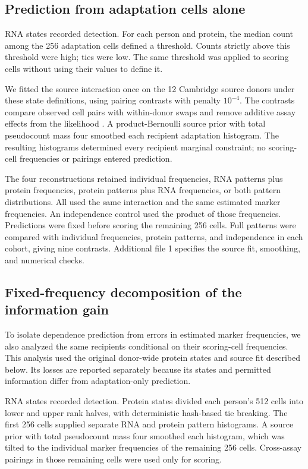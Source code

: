 \documentclass[pdflatex,sn-vancouver-num,iicol]{sn-jnl}
\begin{document}
\subsection{Prediction from adaptation cells alone}
RNA states recorded detection. For each person and protein, the median count
among the 256 adaptation cells defined a threshold. Counts strictly above this
threshold were high; ties were low. The same threshold was applied to scoring
cells without using their values to define it.

We fitted the source interaction once on the 12 Cambridge source donors under
these state definitions, using pairing contrasts with penalty $10^{-4}$.
The contrasts compare observed cell pairs with within-donor swaps and remove
additive assay effects from the likelihood \cite{sei}. A product-Bernoulli
source prior with total pseudocount mass four smoothed each recipient
adaptation histogram. The resulting
histograms determined every recipient marginal constraint; no scoring-cell
frequencies or pairings entered prediction.

The four reconstructions retained individual frequencies, RNA patterns plus
protein frequencies, protein patterns plus RNA frequencies, or both pattern
distributions. All used the same interaction and the same estimated marker
frequencies. An independence control used the product of those frequencies.
Predictions were fixed before scoring the remaining 256 cells. Full patterns
were compared with individual frequencies, protein patterns, and independence
in each cohort, giving nine contrasts. Additional file 1 specifies the source
fit, smoothing, and numerical checks.

\subsection{Fixed-frequency decomposition of the information gain}
To isolate dependence prediction from errors in estimated marker frequencies,
we also analyzed the same recipients conditional on their scoring-cell
frequencies. This analysis used the original donor-wide protein states and
source fit described below. Its losses are reported separately because its
states and permitted information differ from adaptation-only prediction.

RNA states recorded detection. Protein states divided each person's 512 cells
into lower and upper rank halves, with deterministic hash-based tie breaking.
The first 256 cells supplied separate RNA and protein
pattern histograms. A source prior with total pseudocount mass four smoothed each histogram,
which was tilted to the individual marker frequencies of the remaining 256
cells. Cross-assay pairings in those remaining cells were used only for scoring.
\end{document}
